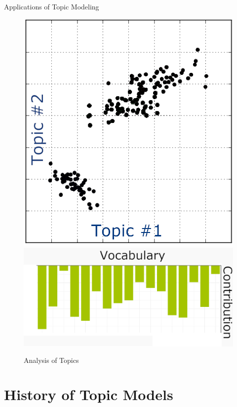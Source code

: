 \documentclass[10pt]{beamer}
\begin{document}
\begin{frame}{Applications of Topic Modeling}
\begin{multicols}{4}
  \hfill
    \begin{figure}
  \includegraphics[width=\columnwidth]{topicanalysis.png}
  \includegraphics[width=\columnwidth]{bar-simple.png}
  \caption{Analysis of Topics}
  \end{figure}

  \end{multicols}

\end{frame}

\section{History of Topic Models}
\end{document}
